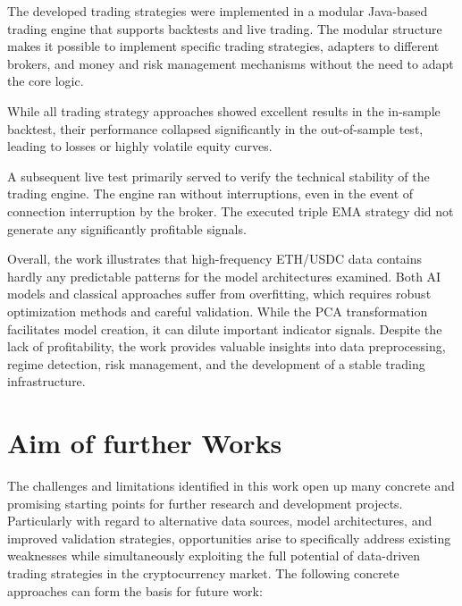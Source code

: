 The developed trading strategies were implemented in a modular Java-based trading engine that supports backtests and live trading.
The modular structure makes it possible to implement specific trading strategies, adapters to different brokers, and money and risk management mechanisms without the need to adapt the core logic.

While all trading strategy approaches showed excellent results in the in-sample backtest, their performance collapsed significantly in the out-of-sample test, leading to losses or highly volatile equity curves.

A subsequent live test primarily served to verify the technical stability of the trading engine.
The engine ran without interruptions, even in the event of connection interruption by the broker.
The executed triple EMA strategy did not generate any significantly profitable signals.

Overall, the work illustrates that high-frequency ETH/USDC data contains hardly any predictable patterns for the model architectures examined.
Both AI models and classical approaches suffer from overfitting, which requires robust optimization methods and careful validation.
While the PCA transformation facilitates model creation, it can dilute important indicator signals.
Despite the lack of profitability, the work provides valuable insights into data preprocessing, regime detection, risk management, and the development of a stable trading infrastructure.

\section{Aim of further Works}
\label{chap:aim-further-works}

The challenges and limitations identified in this work open up many concrete and promising starting points for further research and development projects.
Particularly with regard to alternative data sources, model architectures, and improved validation strategies, opportunities arise to specifically address existing weaknesses while simultaneously exploiting the full potential of data-driven trading strategies in the cryptocurrency market.
The following concrete approaches can form the basis for future work:

